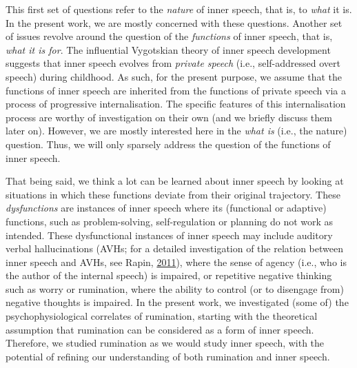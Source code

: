 \documentclass[a4paper,12pt,twoside,openright,oldfontcommands]{memoir}
\begin{document}
This first set of questions refer to the \emph{nature} of inner speech, that is, to \emph{what} it is. In the present work, we are mostly concerned with these questions. Another set of issues revolve around the question of the \emph{functions} of inner speech, that is, \emph{what it is for}. The influential Vygotskian theory of inner speech development suggests that inner speech evolves from \emph{private speech} (i.e., self-addressed overt speech) during childhood. As such, for the present purpose, we assume that the functions of inner speech are inherited from the functions of private speech via a process of progressive internalisation. The specific features of this internalisation process are worthy of investigation on their own (and we briefly discuss them later on). However, we are mostly interested here in the \emph{what is} (i.e., the nature) question. Thus, we will only sparsely address the question of the functions of inner speech.

That being said, we think a lot can be learned about inner speech by looking at situations in which these functions deviate from their original trajectory. These \emph{dysfunctions} are instances of inner speech where its (functional or adaptive) functions, such as problem-solving, self-regulation or planning do not work as intended. These dysfunctional instances of inner speech may include auditory verbal hallucinations (AVHs; for a detailed investigation of the relation between inner speech and AVHs, see Rapin, \protect\hyperlink{ref-Rapin2011}{2011}), where the sense of agency (i.e., who is the author of the internal speech) is impaired, or repetitive negative thinking such as worry or rumination, where the ability to control (or to disengage from) negative thoughts is impaired. In the present work, we investigated (some of) the psychophysiological correlates of rumination, starting with the theoretical assumption that rumination can be considered as a form of inner speech. Therefore, we studied rumination as we would study inner speech, with the potential of refining our understanding of both rumination and inner speech.
\end{document}
